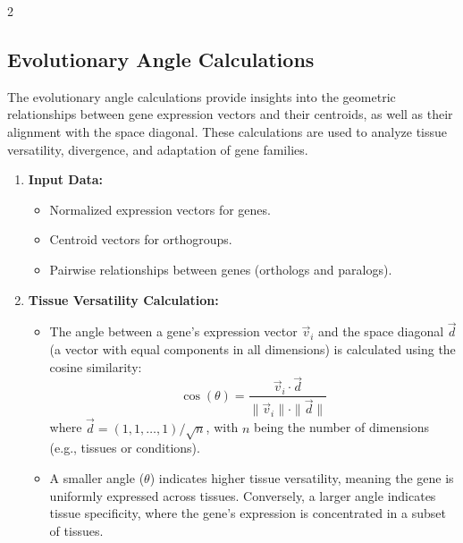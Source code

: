 2\documentclass{article}
\begin{document}
\subsection{Evolutionary Angle Calculations}
The evolutionary angle calculations provide insights into the geometric relationships between gene expression vectors and their centroids, as well as their alignment with the space diagonal. These calculations are used to analyze tissue versatility, divergence, and adaptation of gene families.

\begin{enumerate}
    \item \textbf{Input Data:}
    \begin{itemize}
        \item Normalized expression vectors for genes.
        \item Centroid vectors for orthogroups.
        \item Pairwise relationships between genes (orthologs and paralogs).
    \end{itemize}

    \item \textbf{Tissue Versatility Calculation:}
    \begin{itemize}
        \item The angle between a gene's expression vector \( \vec{v}_i \) and the space diagonal \( \vec{d} \) (a vector with equal components in all dimensions) is calculated using the cosine similarity:
        \[
        \cos(\theta) = \frac{\vec{v}_i \cdot \vec{d}}{\|\vec{v}_i\| \cdot \|\vec{d}\|}
        \]
        where \( \vec{d} = (1, 1, \dots, 1) / \sqrt{n} \), with \( n \) being the number of dimensions (e.g., tissues or conditions).
        \item A smaller angle (\( \theta \)) indicates higher tissue versatility, meaning the gene is uniformly expressed across tissues. Conversely, a larger angle indicates tissue specificity, where the gene's expression is concentrated in a subset of tissues.
    \end{itemize}


\end{enumerate}
\end{document}
